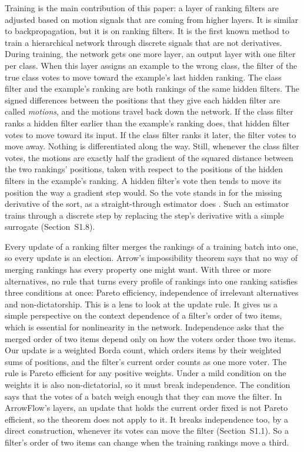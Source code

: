Training is the main contribution of this paper: a layer of ranking filters are adjusted based on motion signals that are coming from higher layers. It is similar to backpropagation, but it is on ranking filters. It is the first known method to train a hierarchical network through discrete signals that are not derivatives.
During training, the network gets one more layer, an output layer with one filter per class. When this layer assigns an example to the wrong class, the filter of the true class votes to move toward the example's last hidden ranking. The class filter and the example's ranking are both rankings of the same hidden filters. The signed differences between the positions that they give each hidden filter are called \emph{motions}, and the motions travel back down the network. If the class filter ranks a hidden filter earlier than the example's ranking does, that hidden filter votes to move toward its input. If the class filter ranks it later, the filter votes to move away. Nothing is differentiated along the way. Still, whenever the class filter votes, the motions are exactly half the gradient of the squared distance between the two rankings' positions, taken with respect to the positions of the hidden filters in the example's ranking. A hidden filter's vote then tends to move its position the way a gradient step would. So the vote stands in for the missing derivative of the sort, as a straight-through estimator does \citep{bengio2013estimating}. Such an estimator trains through a discrete step by replacing the step's derivative with a simple surrogate (Section~S1.8).



Every update of a ranking filter merges the rankings of a training batch into one, so every update is an election. Arrow's impossibility theorem \citep{arrow1951social,arrow1963social} says that no way of merging rankings has every property one might want. With three or more alternatives, no rule that turns every profile of rankings into one ranking satisfies three conditions at once: Pareto efficiency, independence of irrelevant alternatives and non-dictatorship. This is a lens to look at the update rule. It gives us a simple perspective on the context dependence of a filter's order of two items, which is essential for nonlinearity in the network.
Independence asks that the merged order of two items depend only on how the voters order those two items. Our update is a weighted Borda count, which orders items by their weighted sums of positions, and the filter's current order counts as one more voter. The rule is Pareto efficient for any positive weights. Under a mild condition on the weights it is also non-dictatorial, so it must break independence. The condition says that the votes of a batch weigh enough that they can move the filter. In ArrowFlow's layers, an update that holds the current order fixed is not Pareto efficient, so the theorem does not apply to it. It breaks independence too, by a direct construction, whenever its votes can move the filter (Section~S1.1). So a filter's order of two items can change when the training rankings move a third.

